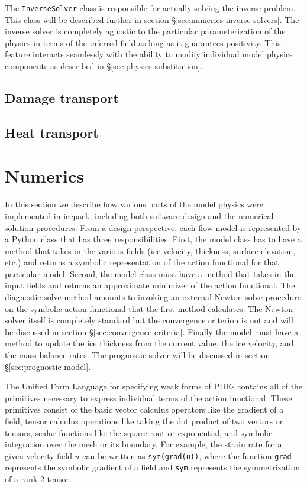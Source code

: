\documentclass{article}
\theoremstyle{definition}
\theoremstyle{plain}
\begin{document}
The \texttt{InverseSolver} class is responsible for actually solving the inverse problem.
This class will be described further in section \S\ref{sec:numerics-inverse-solvers}.
The inverse solver is completely agnostic to the particular parameterization of the physics in terms of the inferred field as long as it guarantees positivity.
This feature interacts seamlessly with the ability to modify individual model physics components as described in \S\ref{sec:physics-substitution}.


\subsection{Damage transport}

\subsection{Heat transport}


\section{Numerics}

In this section we describe how various parts of the model physics were implemented in icepack, including both software design and the numerical solution procedures.
From a design perspective, each flow model is represented by a Python class that has three responsibilities.
First, the model class has to have a method that takes in the various fields (ice velocity, thickness, surface elevation, etc.) and returns a symbolic representation of the action functional for that particular model.
Second, the model class must have a method that takes in the input fields and returns an approximate minimizer of the action functional.
The diagnostic solve method amounts to invoking an external Newton solve procedure on the symbolic action functional that the first method calculates.
The Newton solver itself is completely standard but the convergence criterion is not and will be discussed in section \S\ref{sec:convergence-criteria}.
Finally the model must have a method to update the ice thickness from the current value, the ice velocity, and the mass balance rates.
The prognostic solver will be discussed in section \S\ref{sec:prognostic-model}.

The Unified Form Language for specifying weak forms of PDEs contains all of the primitives necessary to express individual terms of the action functional.
These primitives consist of the basic vector calculus operators like the gradient of a field, tensor calculus operations like taking the dot product of two vectors or tensors, scalar functions like the square root or exponential, and symbolic integration over the mesh or its boundary.
For example, the strain rate for a given velocity field $u$ can be written as \texttt{sym(grad(u))}, where the function \texttt{grad} represents the symbolic gradient of a field and \texttt{sym} represents the symmetrization of a rank-2 tensor.
\end{document}
